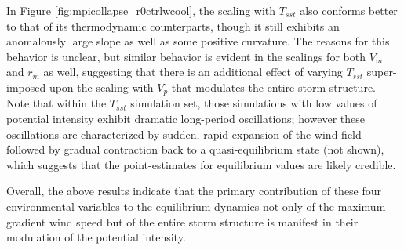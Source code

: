 \documentclass[12pt]{article}
\begin{document}
In Figure \ref{fig:mpicollapse_r0ctrlwcool}, the scaling with $T_{sst}$ also conforms better to that of its thermodynamic counterparts, though it still exhibits an anomalously large slope as well as some positive curvature. The reasons for this behavior is unclear, but similar behavior is evident in the scalings for both $V_m$ and $r_m$ as well, suggesting that there is an additional effect of varying $T_{sst}$ super-imposed upon the scaling with $V_p$ that modulates the entire storm structure.  Note that within the $T_{sst}$ simulation set, those simulations with low values of potential intensity exhibit dramatic long-period oscillations; however these oscillations are characterized by sudden, rapid expansion of the wind field followed by gradual contraction back to a quasi-equilibrium state (not shown), which suggests that the point-estimates for equilibrium values are likely credible.





Overall, the above results indicate that the primary contribution of these four environmental variables to the equilibrium dynamics not only of the maximum gradient wind speed but of the entire storm structure is manifest in their modulation of the potential intensity.  


\end{document}
